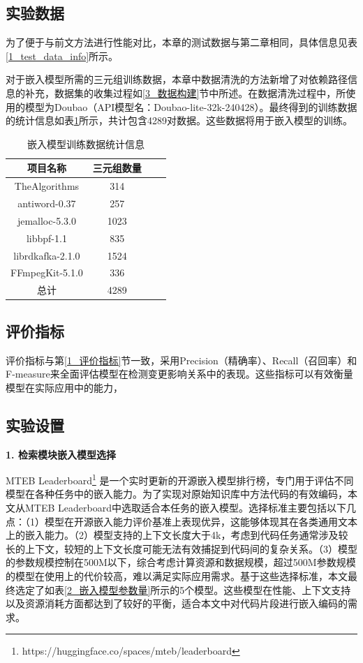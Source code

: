 \subsection{实验数据}

为了便于与前文方法进行性能对比，本章的测试数据与第二章相同，具体信息见表\ref{1_test_data_info}所示。

对于嵌入模型所需的三元组训练数据，本章中数据清洗的方法新增了对依赖路径信息的补充，数据集的收集过程如\ref{3_数据构建}节中所述。在数据清洗过程中，所使用的模型为Doubao（API模型名：Doubao-lite-32k-240428）。最终得到的训练数据的统计信息如表\ref{1_数据集统计信息}所示，共计包含4289对数据。这些数据将用于嵌入模型的训练。


\begin{table}[htbp]
\caption{嵌入模型训练数据统计信息}
\label{1_数据集统计信息}
\vspace{0.5em}\centering\wuhao
\begin{tabular}{cccc}
\toprule
项目名称 & 三元组数量 \\
\midrule
TheAlgorithms    & 314   \\
antiword-0.37    & 257   \\
jemalloc-5.3.0   & 1023   \\
libbpf-1.1       & 835   \\
librdkafka-2.1.0 & 1524  \\
FFmpegKit-5.1.0  & 336   \\ 
总计              & 4289  \\
\bottomrule
\end{tabular}
\end{table}

\subsection{评价指标} 

评价指标与第\ref{1_评价指标}节一致，采用Precision（精确率）、Recall（召回率）和F-measure来全面评估模型在检测变更影响关系中的表现。这些指标可以有效衡量模型在实际应用中的能力，

\subsection{实验设置}

\noindent \textbf{1. 检索模块嵌入模型选择}

MTEB Leaderboard\footnote{https://huggingface.co/spaces/mteb/leaderboard} 是一个实时更新的开源嵌入模型排行榜，专门用于评估不同模型在各种任务中的嵌入能力。为了实现对原始知识库中方法代码的有效编码，本文从MTEB Leaderboard中选取适合本任务的嵌入模型。选择标准主要包括以下几点：（1）模型在开源嵌入能力评价基准上表现优异，这能够体现其在各类通用文本上的嵌入能力。（2）模型支持的上下文长度大于4k，考虑到代码任务通常涉及较长的上下文，较短的上下文长度可能无法有效捕捉到代码间的复杂关系。（3）模型的参数规模控制在500M以下，综合考虑计算资源和数据规模，超过500M参数规模的模型在使用上的代价较高，难以满足实际应用需求。基于这些选择标准，本文最终选定了如表\ref{2_嵌入模型参数量}所示的5个模型。这些模型在性能、上下文支持以及资源消耗方面都达到了较好的平衡，适合本文中对代码片段进行嵌入编码的需求。
    
